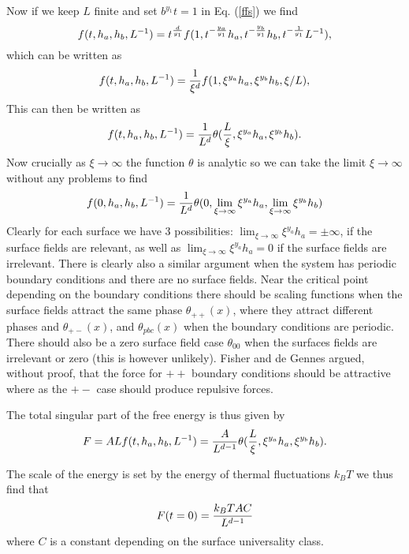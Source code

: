 Now if we keep $L$ finite and set $b^{y_1}t=1$ in Eq. (\ref{ffs}) we find
\begin{equation}
f(t,h_a,h_b,L^{-1}) = t^{d\over y_1}f(1, t^{-{y_a\over y_1}} h_a, t^{-{y_b\over y_1}} h_b, t^{-{1\over y_1}}L^{-1}), \label{ffs}
\end{equation}
which can be written as
\begin{equation}
f(t,h_a,h_b,L^{-1}) = {1\over \xi^d}f(1,\xi^{y_a} h_a, \xi^{y_b} h_b, \xi/L),
\end{equation}
This can then be written as
\begin{equation}
f(t,h_a,h_b,L^{-1}) = {1\over L^d}\theta({L\over \xi}, \xi^{y_a} h_a, \xi^{y_b} h_b).
\end{equation}
Now crucially as $\xi \to \infty$ the function $\theta$ is analytic so we can take the limit $\xi\to\infty$ without any problems to find
\begin{equation}
f(0,h_a,h_b,L^{-1}) = {1\over L^d}\theta(0, \lim_{\xi\to \infty} \xi^{y_a} h_a,\lim_{\xi\to \infty}  \xi^{y_b} h_b)
\end{equation}
Clearly for each surface we have 3 possibilities: $\lim_{\xi\to \infty} \xi^{y_a} h_a = \pm \infty$, if the surface fields are relevant, as well as $\lim_{\xi\to \infty} \xi^{y_a} h_a = 0$ if the surface fields are irrelevant. There is clearly also a similar argument when the system has periodic boundary conditions and there are no surface fields. Near the critical point depending on the boundary conditions there should be scaling functions  when the surface fields attract the same phase $\theta_{++}(x)$, where they attract different phases and
$\theta_{+-}(x)$, and $\theta_{pbc}(x)$ when the boundary conditions are periodic. There should also be a zero surface field case $\theta_{00}$ when the surfaces fields are irrelevant or zero (this is however unlikely). Fisher and de Gennes argued, without proof, that the force for $++$ boundary conditions should be attractive where as the $+-$ case should produce repulsive forces.   

The total singular part of the free energy is thus given by
\begin{equation}
F = ALf(t,h_a,h_b,L^{-1}) = {A\over L^{d-1}}\theta({L\over \xi}, \xi^{y_a} h_a, \xi^{y_b} h_b).
\end{equation}

The scale of the energy is set by the energy of thermal fluctuations $k_BT$ we thus find
that 
\begin{equation}
F(t=0) = {k_BT A C\over L^{d-1}}\label{casfreeenergy}
\end{equation}
where $C$ is a constant depending on the surface universality class.



